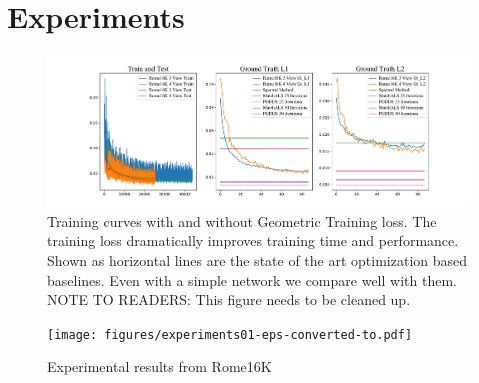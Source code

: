 \documentclass[10pt,twocolumn,letterpaper]{article}
\begin{document}
\section{Experiments}

\begin{figure}
\begin{center}
  \includegraphics[width=0.8\linewidth]{figures/TrainingCurves.pdf}
  \end{center}
    \caption{
      Training curves with and without Geometric Training loss.
      The training loss dramatically improves training time and performance.
      Shown as horizontal lines are the state of the art optimization based baselines.
      Even with a simple network we compare well with them.
      NOTE TO READERS: This figure needs to be cleaned up.
    }
  \label{fig:short}
\end{figure}

\begin{figure}
\begin{center}
  \texttt{[image: figures/experiments01-eps-converted-to.pdf]}
  \end{center}
     \caption{Experimental results from Rome16K}
  \label{fig:short}
\end{figure}
\end{document}
